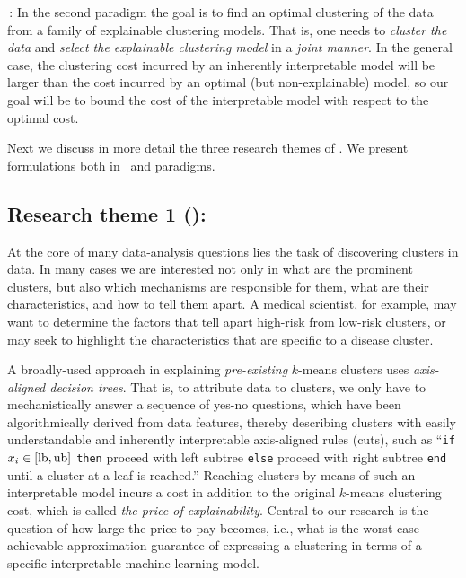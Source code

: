 \documentclass[a4paper,11pt]{article}
\begin{document}
\smallskip
{\joint\,:}
In the second paradigm the goal is to find an optimal clustering of the data
from a family of explainable clustering models.
That is, one needs to \emph{cluster the data} and \emph{select the explainable clustering model}
in a \emph{joint manner}.
In the general case, the clustering cost incurred by an inherently interpretable model 
will be larger than the cost incurred by an optimal (but non-explainable) model, 
so our goal will be to bound the cost of the interpretable model with respect to the optimal cost.

\smallskip
Next we discuss in more detail the three research themes of \acronym.
We present formulations both in \posthoc\ and \joint paradigms.


\subsection*{Research theme 1 (\rto): \newmodels}

At the core of many data-analysis questions lies the task of discovering clusters in data. 
In many cases we are interested not only in what are the prominent clusters, 
but also which mechanisms are responsible for them,  
what are their characteristics, and how to tell them apart.  
A medical scientist, for example, may want to determine the factors that tell apart 
high-risk from low-risk clusters, 
or may seek to highlight the characteristics that are specific to a disease cluster.  

A broadly-used \posthoc approach in explaining \emph{pre-existing} $k$-means clusters uses 
\emph{axis-aligned decision trees}. 
That is, to attribute data to clusters, 
we only have to mechanistically answer a sequence of yes-no questions, 
which have been algorithmically derived from data features, 
thereby describing clusters with easily understandable and inherently interpretable axis-aligned rules (cuts), 
{\color{brown}such as 
``\texttt{if} $x_i \in [\textnormal{lb}, \textnormal{ub}]$ \texttt{then} 
proceed with left sub\-tree \texttt{else} proceed with right sub\-tree \texttt{end} until a cluster at a leaf is reached.''}
Reaching clusters by means of such an interpretable model incurs 
a cost in addition to the original $k$-means clustering cost, 
which is called \emph{the price of explainability}.
Central to our research is the question of how large the price to pay becomes, {\color{brown} i.e., 
what is the worst-case achievable approximation guarantee of expressing a clustering 
in terms of a specific interpretable machine-learning model. }
\end{document}
